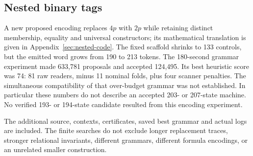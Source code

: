\subsection{Nested binary tags}
A new proposed encoding replaces $4p$ with $2p$ while retaining distinct
membership, equality and universal constructors; its mathematical
translation is given in Appendix~\ref{sec:nested-code}. The fixed scaffold
shrinks to 133 controls, but the emitted word grows from 190 to 213 tokens.
The 180-second grammar experiment made 633,781 proposals and accepted
124,495. Its best heuristic score was 74: 81 raw readers, minus 11 nominal
folds, plus four scanner penalties. The simultaneous compatibility of
that over-budget grammar was not established. In particular these
numbers do not describe an accepted 203- or 207-state machine. No verified
193- or 194-state candidate resulted from this encoding experiment.

The additional source, contexts, certificates, saved best grammar and
actual logs are included. The finite searches do not exclude longer
replacement traces, stronger relational invariants, different grammars,
different formula encodings, or an unrelated smaller construction.
